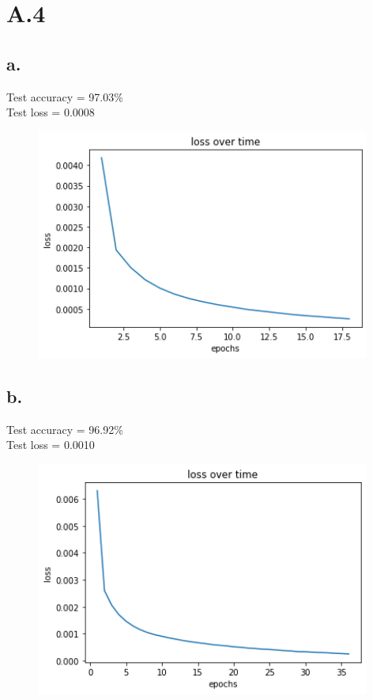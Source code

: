 \documentclass{article}
\newcommand{\1}{\mathbf{1}}
\begin{document}
\section*{A.4}
{\Large 

\subsection*{a.}

Test accuracy = 97.03\% \\
Test loss = 0.0008

\begin{figure}[h]
  \centering
  \includegraphics[width=110mm]{../hw3-code/results/a4/a4_a.png}
\end{figure}

\subsection*{b.}

Test accuracy = 96.92\% \\
Test loss = 0.0010

\begin{figure}[h]
  \centering
  \includegraphics[width=110mm]{../hw3-code/results/a4/a4_b.png}
\end{figure}

}
\end{document}
